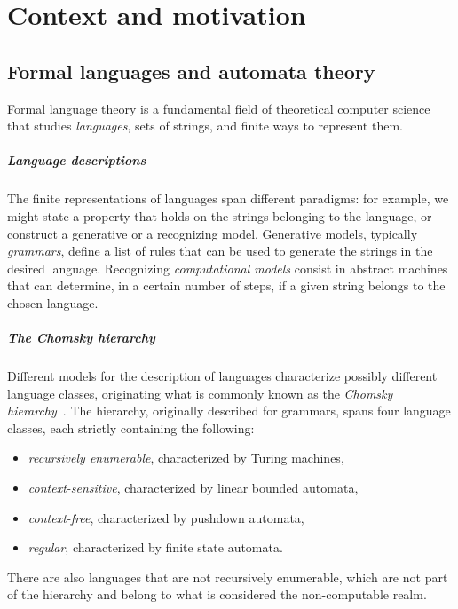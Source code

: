 \chapter{Context and motivation}\label{ch:context}



\section{Formal languages and automata theory}
Formal language theory is a fundamental field of theoretical computer science that studies \emph{languages}, \ie sets of strings, and finite ways to represent them.

\paragraph{Language descriptions} The finite representations of languages span different paradigms: for example, we might state a property that holds on the strings belonging to the language, or construct a generative or a recognizing model.
Generative models, typically \emph{grammars}, define a list of rules that can be used to generate the strings in the desired language.
Recognizing \emph{computational models} consist in abstract machines that can determine, in a certain number of steps, if a given string belongs to the chosen language.

\paragraph{The Chomsky hierarchy} Different models for the description of languages characterize possibly different language classes, originating what is commonly known as the \emph{Chomsky hierarchy}~\cite{Cho56}.
The hierarchy, originally described for grammars, spans four language classes, each strictly containing the following:
\begin{itemize}
	\item \emph{recursively enumerable}, characterized by Turing machines,
	\item \emph{context-sensitive}, characterized by linear bounded automata,
	\item \emph{context-free}, characterized by pushdown automata,
	\item \emph{regular}, characterized by finite state automata.
\end{itemize}
There are also languages that are not recursively enumerable, which are not part of the hierarchy and belong to what is considered the non-computable realm.

